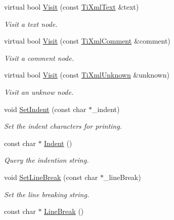 \begin{DoxyCompactItemize}
virtual bool \hyperlink{classTiXmlPrinter_a0857c5d32c59b9a257f9a49cb9411df5}{Visit} (const \hyperlink{classTiXmlText}{TiXmlText} \&text)
\begin{DoxyCompactList}\small\item\em Visit a text node. \item\end{DoxyCompactList}\item 
virtual bool \hyperlink{classTiXmlPrinter_a9870423f5603630e6142f6bdb66dfb57}{Visit} (const \hyperlink{classTiXmlComment}{TiXmlComment} \&comment)
\begin{DoxyCompactList}\small\item\em Visit a comment node. \item\end{DoxyCompactList}\item 
virtual bool \hyperlink{classTiXmlPrinter_a08591a15c9a07afa83c24e08b03d6358}{Visit} (const \hyperlink{classTiXmlUnknown}{TiXmlUnknown} \&unknown)
\begin{DoxyCompactList}\small\item\em Visit an unknow node. \item\end{DoxyCompactList}\item 
void \hyperlink{classTiXmlPrinter_a213377a4070c7e625bae59716b089e5e}{SetIndent} (const char $\ast$\_\-indent)
\begin{DoxyCompactList}\small\item\em Set the indent characters for printing. \item\end{DoxyCompactList}\item 
const char $\ast$ \hyperlink{classTiXmlPrinter_abb33ec7d4bad6aaeb57f4304394b133d}{Indent} ()
\begin{DoxyCompactList}\small\item\em Query the indention string. \item\end{DoxyCompactList}\item 
void \hyperlink{classTiXmlPrinter_a4be1e37e69e3858c59635aa947174fe6}{SetLineBreak} (const char $\ast$\_\-lineBreak)
\begin{DoxyCompactList}\small\item\em Set the line breaking string. \item\end{DoxyCompactList}\item 
const char $\ast$ \hyperlink{classTiXmlPrinter_a11f1b4804a460b175ec244eb5724d96d}{LineBreak} ()

\end{DoxyCompactItemize}
